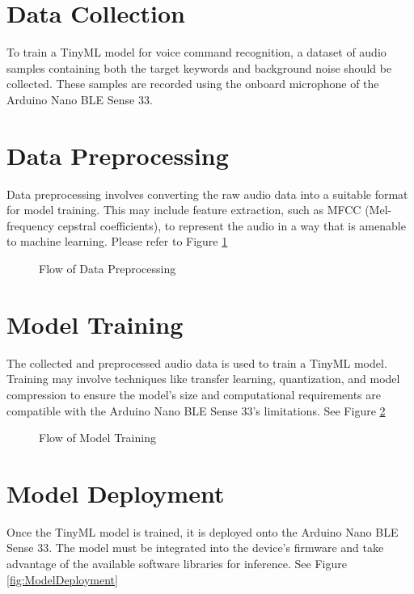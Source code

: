 \section{Data Collection}
To train a TinyML model for voice command recognition, a dataset of audio samples containing both the target keywords and background noise should be collected. These samples are recorded using the onboard microphone of the Arduino Nano BLE Sense 33.


\section{Data Preprocessing}
Data preprocessing involves converting the raw audio data into a suitable format for model training. This may include feature extraction, such as MFCC (Mel-frequency cepstral coefficients), to represent the audio in a way that is amenable to machine learning. Please refer to Figure \ref{fig:DataPreprocessingFlow}

\begin{figure}[h!]
	\centering
	
	\caption{Flow of Data Preprocessing} \label{fig:DataPreprocessingFlow}
\end{figure}

\section{Model Training}
The collected and preprocessed audio data is used to train a TinyML model. Training may involve techniques like transfer learning, quantization, and model compression to ensure the model's size and computational requirements are compatible with the Arduino Nano BLE Sense 33's limitations. See Figure \ref{fig:ModelTrainingFlow}

\begin{figure}[h!]
	\centering
	
	\caption{Flow of Model Training} \label{fig:ModelTrainingFlow}
\end{figure}

\section{Model Deployment}
Once the TinyML model is trained, it is deployed onto the Arduino Nano BLE Sense 33. The model must be integrated into the device's firmware and take advantage of the available software libraries for inference. See Figure \ref{fig:ModelDeployment}

